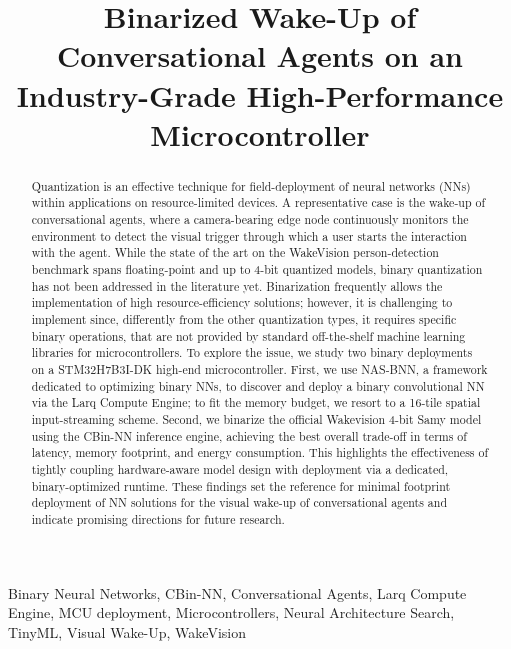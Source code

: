 \documentclass[conference]{IEEEtran}
\begin{document}
\title{Binarized Wake-Up of Conversational Agents on an Industry-Grade High-Performance Microcontroller}

\author{
}

\maketitle

\begin{abstract}
Quantization is an effective technique for field-deployment of neural networks (NNs) within applications on resource-limited devices.
A representative case is the wake-up of conversational agents, where a camera-bearing edge node continuously monitors the environment to detect the visual trigger through which a user starts the interaction with the agent.
While the state of the art on the WakeVision person-detection benchmark spans floating-point and up to 4-bit quantized models, binary quantization has not been addressed in the literature yet.
Binarization frequently allows the implementation of high resource-efficiency solutions; however, it is challenging to implement since, differently from the other quantization types, it requires specific binary operations, that are not provided by standard off-the-shelf machine learning libraries for microcontrollers.
To explore the issue, we study two binary deployments on a STM32H7B3I-DK high-end microcontroller.
First, we use NAS-BNN, a framework dedicated to optimizing binary NNs, to discover and deploy a binary convolutional NN via the Larq Compute Engine; to fit the memory budget, we resort to a 16-tile spatial input-streaming scheme.
Second, we binarize the official Wakevision 4-bit Samy model using the CBin-NN inference engine, achieving the best overall trade-off in terms of latency, memory footprint, and energy consumption. This highlights the effectiveness of tightly coupling hardware-aware model design with deployment via a dedicated, binary-optimized runtime. These findings set the reference for minimal footprint deployment of NN solutions for the visual wake-up of conversational agents and indicate promising directions for future research.
\end{abstract}

\begin{IEEEkeywords}
Binary Neural Networks, CBin-NN, Conversational Agents, Larq Compute Engine, MCU deployment, Microcontrollers, Neural Architecture Search, TinyML,  Visual Wake-Up, WakeVision
\end{IEEEkeywords}
\end{document}
